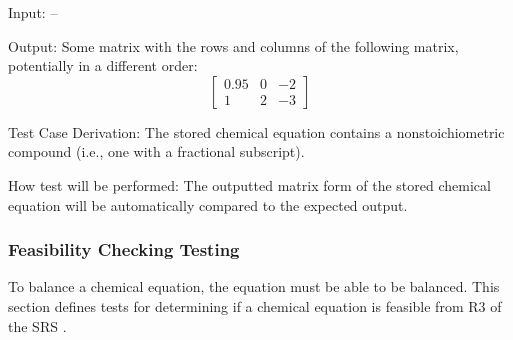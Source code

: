 \documentclass[12pt, titlepage]{article}
\begin{document}
\begin{enumerate}
    Input: --

    Output: Some matrix with the rows and columns of the following matrix,
    potentially in a different order:
    $$\begin{bmatrix}
        0.95 & 0 & -2 \\
        1    & 2 & -3
      \end{bmatrix}$$

    Test Case Derivation: The stored chemical equation contains a
    nonstoichiometric compound (i.e., one with a fractional subscript).

    How test will be performed: The outputted matrix form of the stored
    chemical equation will be automatically compared to the expected output.

\end{enumerate}

\subsubsection{Feasibility Checking Testing}

To balance a chemical equation, the equation must be able to be balanced. This
section defines tests for determining if a chemical equation is feasible from
R3 of the SRS . 
\end{document}
